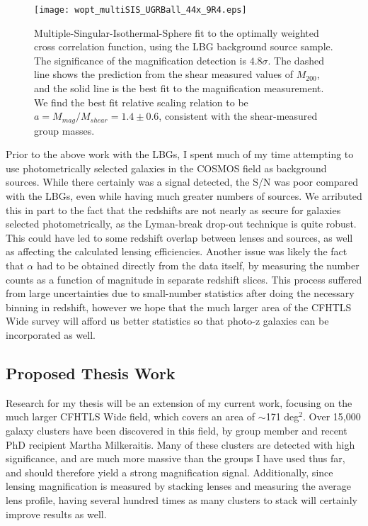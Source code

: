 \documentclass{article}
\begin{document}
\begin{figure*}
 \begin{center}
  \texttt{[image: wopt\_multiSIS\_UGRBall\_44x\_9R4.eps]}
  \caption{Multiple-Singular-Isothermal-Sphere fit to the optimally weighted cross correlation function, using the LBG background source sample. The significance of the magnification detection is $4.8 \sigma$.  The dashed line shows the prediction from the shear measured values of $M_{200}$, and the solid line is the best fit to the magnification measurement. We find the best fit relative scaling relation to be $a= M_{mag}/M_{shear}=1.4 \pm 0.6$, consistent with the shear-measured group masses.}
  \label{multisis}
 \end{center}
\end{figure*}


Prior to the above work with the LBGs, I spent much of my time attempting to use photometrically selected galaxies in the COSMOS field as background sources. While there certainly was a signal detected, the S/N was poor compared with the LBGs, even while having much greater numbers of sources. We arributed this in part to the fact that the redshifts are not nearly as secure for galaxies selected photometrically, as the Lyman-break drop-out technique is quite robust. This could have led to some redshift overlap between lenses and sources, as well as affecting the calculated lensing efficiencies. Another issue was likely the fact that $\alpha$ had to be obtained directly from the data itself, by measuring the number counts as a function of magnitude in separate redshift slices. This process suffered from large uncertainties due to small-number statistics after doing the necessary binning in redshift, however we hope that the much larger area of the CFHTLS Wide survey will afford us better statistics so that photo-z galaxies can be incorporated as well.

\subsection{Proposed Thesis Work}
Research for my thesis will be an extension of my current work, focusing on the much larger CFHTLS Wide field, which covers an area of $\sim$171 deg$^2$. Over 15,000 galaxy clusters have been discovered in this field, by group member and recent PhD recipient Martha Milkeraitis. Many of these clusters are detected with high significance, and are much more massive than the groups I have used thus far, and should therefore yield a strong magnification signal. Additionally, since lensing magnification is measured by stacking lenses and measuring the average lens profile, having several hundred times as many clusters to stack will certainly improve results as well.
\end{document}
